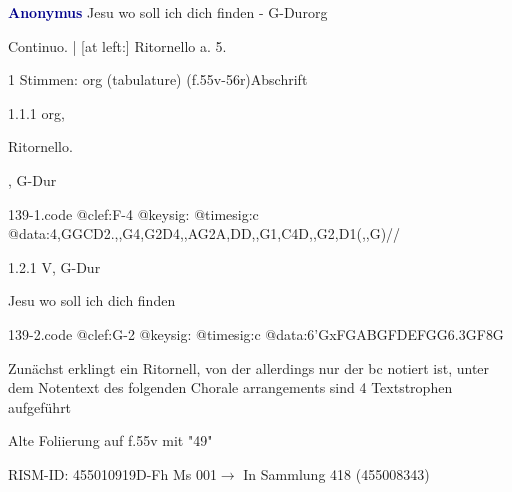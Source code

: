 \documentclass[twocolumn]{book}
\begin{document}
\par \vspace{7pt} \textcolor{darkblue}{\textbf{Anonymus  }}\hfillplus{\textbf{[139]}}\newline Jesu wo soll ich dich finden - G-Dur\newline org
\par \begin{itshape}[f.55v, heading:] Continuo. | [at left:] Ritornello a. 5.\end{itshape} 
\par \textcolor{darkblue}{}  1 Stimmen: org (tabulature)  (f.55v-56r)\newline Abschrift
\par 1.1.1  org, \begin{itshape}Ritornello.\end{itshape}, G-Dur  
\begin{filecontents*}{139-1.code}
@clef:F-4
@keysig:
@timesig:c
@data:4,GGCD2.,,G4,G2D4,,AG2A,DD,,G1,C4D,,G2,D1(,,G)//
\end{filecontents*}
\newline
%
\par 1.2.1  V, G-Dur\newline \begin{footnotesize} Jesu wo soll ich dich finden \end{footnotesize}  
\begin{filecontents*}{139-2.code}
@clef:G-2
@keysig:
@timesig:c
@data:{6'GxFGA}{BGFD}{EFGG}{6.3GF}8G
\end{filecontents*}
\newline
%
\par Zunächst erklingt ein Ritornell, von der allerdings nur der bc notiert ist, unter dem Notentext des folgenden Chorale arrangements sind 4 Textstrophen aufgeführt
\par Alte Foliierung auf f.55v mit "49"
\par RISM-ID: 455010919\newline D-Fh  Ms 001\newline $\rightarrow$ In Sammlung 418 (455008343)
      
\end{document}
